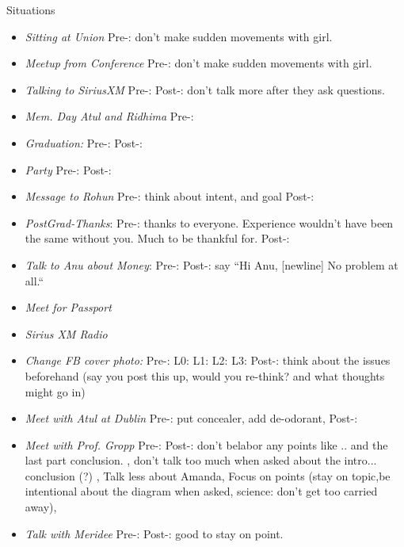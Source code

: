 \documentclass[serif, mathserif, final]{beamer}
\begin{document}
\begin{frame}{}
\begin{columns}
\begin{column}{0.20\linewidth}
  \begin{block}{Situations}
    \begin{itemize}
\tiny \item \tiny \textit{Sitting at Union} Pre-: don't make
        sudden movements with girl.
      \item \tiny \textit{Meetup from Conference} Pre-: don't make
        sudden movements with girl.  
        \item \tiny \textit{Talking to SiriusXM} Pre-:  Post-: don't
          talk more after they ask questions.  

        \item \tiny \textit{Mem. Day Atul and Ridhima} Pre-: 
      \item \tiny \textit{Graduation:} Pre-:   Post-: 
      \item \tiny \textit{Party } Pre-:  Post-:

      \item \tiny \textit{Message to Rohun} Pre-: think about intent,
        and goal Post-: 
        \item \tiny \textit{PostGrad-Thanks}: Pre-: thanks to
          everyone. Experience wouldn't have been the same without
          you. Much to be thankful for. Post-: %
          \item \tiny \textit{Talk to Anu about Money}: Pre-:   Post-:
            say ``Hi Anu,  [newline] No problem at all.`` 

            \item \tiny \textit{Meet for Passport}
            \item \tiny \textit{Sirius XM Radio} 

            \item \tiny \textit{Change FB cover photo:} Pre-: L0: L1:
              L2: L3: Post-: think about the issues beforehand (say
              you post this up, would you re-think? and what thoughts
              might go in) 
              \item \tiny \textit{Meet with Atul at Dublin} Pre-: put
                concealer, add de-odorant, Post-: 

              \item \tiny \textit{Meet with Prof. Gropp} Pre-:  Post-:
                don't belabor any points like .. and the last part
                conclusion. , don't talk too much when asked about the
                intro... conclusion (?) ,
                Talk less about Amanda, Focus on points (stay on
                topic,be intentional about the diagram when asked,
                science: don't get too carried away),
              \item \tiny \textit{Talk with Meridee} Pre-:  Post-:
                good to stay on point.


\end{itemize}
\end{block}
\end{column}
\end{columns}
\end{frame}
\end{document}
